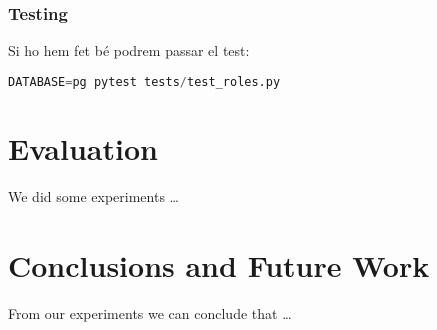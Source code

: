 \documentclass[a4paper, 11pt]{article}
\begin{document}
\subsubsection{Testing}
Si ho hem fet bé podrem passar el test:
\begin{lstlisting}[language=Python, caption=Testing 7]
  DATABASE=pg pytest tests/test_roles.py
\end{lstlisting}


\pagebreak

\section{Evaluation}

We did some experiments \ldots

\pagebreak

\section{Conclusions and Future Work}

From our experiments we can conclude that \ldots


\end{document}
